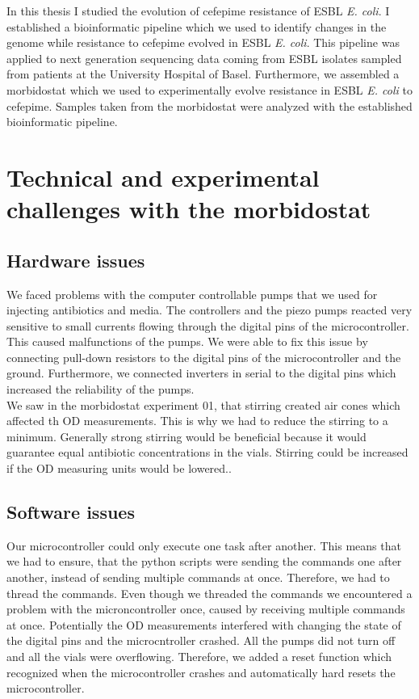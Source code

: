 In this thesis I studied the evolution of cefepime resistance of ESBL \textit{E. coli}. I established a bioinformatic pipeline which we used to identify changes in the genome while resistance to cefepime evolved in ESBL \textit{E. coli}. This pipeline was applied to next generation sequencing data coming from ESBL isolates sampled from patients at the University Hospital of Basel. Furthermore, we assembled a morbidostat which we used to experimentally evolve resistance in ESBL \textit{E. coli} to cefepime. Samples taken from the morbidostat were analyzed with the established bioinformatic pipeline. 

\section{Technical and experimental challenges with the morbidostat}
\subsection{Hardware issues}
We faced problems with the computer controllable pumps that we used for injecting antibiotics and media. The controllers and the piezo pumps reacted very sensitive to small currents flowing through the digital pins of the microcontroller. This caused malfunctions of the pumps. We were able to fix this issue by connecting pull-down resistors to the digital pins of the microcontroller and the ground. Furthermore, we connected inverters in serial to the digital pins which increased the reliability of the pumps.\\
We saw in the morbidostat experiment 01, that stirring created air cones which affected th OD measurements. This is why we had to reduce the stirring to a minimum. Generally strong stirring would be beneficial because it would guarantee equal antibiotic concentrations in the vials. Stirring could be increased if the OD measuring units would be lowered.. 
\subsection{Software issues}
Our microcontroller could only execute one task after another. This means that we had to ensure, that the python scripts were sending the commands one after another, instead of sending multiple commands at once. Therefore, we had to thread the commands.  Even though we threaded the commands we encountered a problem with the microncontroller once, caused by receiving multiple commands at once. Potentially the OD measurements interfered with changing the state of the digital pins and the microcntroller crashed. All the pumps did not turn off and all the vials were overflowing. Therefore, we added a reset function which recognized when the microcontroller crashes and automatically hard resets the microcontroller. 


